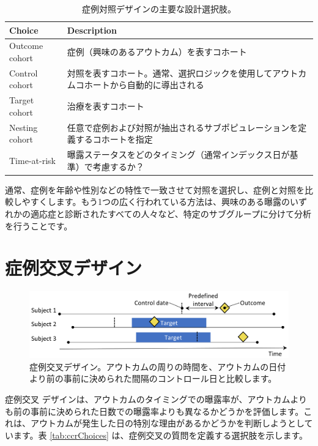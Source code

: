 \documentclass[
  11pt]{book}
\theoremstyle{definition}
\theoremstyle{definition}
\theoremstyle{definition}
\theoremstyle{definition}
\theoremstyle{remark}
\begin{document}
\begin{table}
\centering
\caption{\label{tab:ccChoices}症例対照デザインの主要な設計選択肢。}
\centering
\begin{tabular}[t]{l>{\raggedright\arraybackslash}p{9cm}}
\toprule
Choice & Description\\
\midrule
Outcome cohort & 症例（興味のあるアウトカム）を表すコホート\\
Control cohort & 対照を表すコホート。通常、選択ロジックを使用してアウトカムコホートから自動的に導出される\\
Target cohort & 治療を表すコホート\\
Nesting cohort & 任意で症例および対照が抽出されるサブポピュレーションを定義するコホートを指定\\
Time-at-risk & 曝露ステータスをどのタイミング（通常インデックス日が基準）で考慮するか？\\
\bottomrule
\end{tabular}
\end{table}

通常、症例を年齢や性別などの特性で一致させて対照を選択し、症例と対照を比較しやすくします。もう1つの広く行われている方法は、興味のある曝露のいずれかの適応症と診断されたすべての人々など、特定のサブグループに分けて分析を行うことです。

\section{症例交叉デザイン}\label{ux75c7ux4f8bux4ea4ux53c9ux30c7ux30b6ux30a4ux30f3}


\begin{figure}[h]

{\centering \includegraphics[width=0.9\linewidth]{images/PopulationLevelEstimation/caseCrossover} 

}

\caption{症例交叉デザイン。アウトカムの周りの時間を、アウトカムの日付より前の事前に決められた間隔のコントロール日と比較します。}\label{fig:caseCrossover}
\end{figure}

症例交叉 \citep[ ]{maclure_1991} デザインは、アウトカムのタイミングでの曝露率が、アウトカムよりも前の事前に決められた日数での曝露率よりも異なるかどうかを評価します。これは、アウトカムが発生した日の特別な理由があるかどうかを判断しようとしています。表 \ref{tab:ccrChoices} は、症例交叉の質問を定義する選択肢を示します。 
\end{document}
